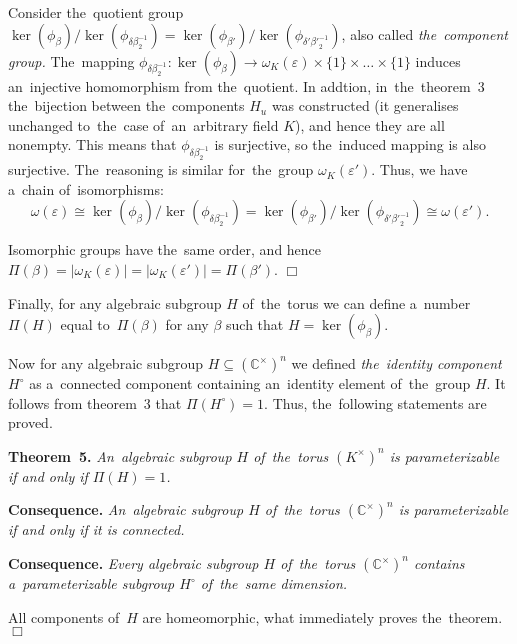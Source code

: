 \documentclass[twoside]{article}
\begin{document}
    Consider the~quotient group $\ker(\phi_\beta) / \ker(\phi_{\delta \beta_2^{-1}}) = \ker(\phi_{\beta'}) / \ker(\phi_{\delta' {\beta'}_2^{-1}})$,
    also called \textit{the~component group.} The~mapping $\phi_{\delta \beta_2^{-1}} : \ker(\phi_\beta) \rightarrow \omega_K(\varepsilon) \times \{ 1 \} \times \ldots \times \{ 1 \}$
    induces an~injective homomorphism from the~quotient. In addtion, in~the~theorem~3 the~bijection between the~components $H_u$
    was constructed (it generalises unchanged to~the~case of~an~arbitrary field $K$), and hence they are all nonempty.
    This means that $\phi_{\delta \beta_2^{-1}}$ is surjective, so the~induced mapping is also surjective.
    The~reasoning is similar for~the~group $\omega_K(\varepsilon')$. Thus, we have a~chain of~isomorphisms:
    $$
        \omega(\varepsilon) \cong \ker(\phi_\beta) / \ker(\phi_{\delta \beta_2^{-1}}) = \ker(\phi_{\beta'}) / \ker(\phi_{\delta' {\beta'}_2^{-1}}) \cong \omega(\varepsilon').
    $$

    Isomorphic groups have the~same order, and hence $\Pi(\beta) = |\omega_K(\varepsilon)| = |\omega_K(\varepsilon')| = \Pi(\beta')$.
\hfill$\Box$\medskip

Finally, for any algebraic subgroup $H$ of~the~torus we can define a~number $\Pi(H)$ equal to~$\Pi(\beta)$
for any $\beta$ such that $H = \ker(\phi_\beta)$.

Now for any algebraic subgroup $H \subseteq (\mathbb{C}^\times)^n$ we defined \textit{the~identity component} $H^\circ$
as a~connected component containing an~identity element of~the~group $H$. It follows from theorem~3
that $\Pi(H^\circ) = 1$. Thus, the~following statements are proved.

\medskip\noindent\textbf{Theorem~5.}\emph{
    An~algebraic subgroup $H$ of~the~torus $(K^\times)^n$ is parameterizable if and only if $\Pi(H) = 1$.
}

\medskip\noindent\textbf{Consequence.}\emph{
    An~algebraic subgroup $H$ of~the~torus $(\mathbb{C}^\times)^n$ is parameterizable if and only if it is connected.
}

\medskip\noindent\textbf{Consequence.}\emph{
    Every algebraic subgroup $H$ of~the~torus $(\mathbb{C}^\times)^n$ contains a~parameterizable subgroup $H^\circ$ of~the~same dimension.
}\medskip

    All components of~$H$ are homeomorphic, what immediately proves the~theorem.
\hfill$\Box$\medskip
\end{document}
